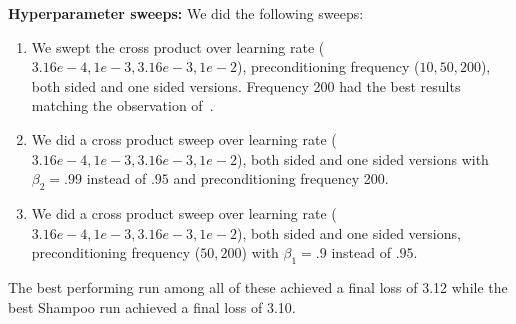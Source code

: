 \documentclass{article}
\begin{document}
\textbf{Hyperparameter sweeps:} We did the following sweeps:
\begin{enumerate}
    \item We swept the cross product over learning rate ($3.16e-4, 1e-3, 3.16e-3, 1e-2$), preconditioning frequency ($10, 50, 200$), both sided and one sided versions. Frequency 200 had the best results matching the observation of~\citet{galore}.
    \item We did a cross product sweep over learning rate ($3.16e-4, 1e-3, 3.16e-3, 1e-2$), both sided and one sided versions with $\beta_2 = .99$ instead of $.95$ and preconditioning frequency 200.
    \item We did a cross product sweep over learning rate ($3.16e-4, 1e-3, 3.16e-3, 1e-2$), both sided and one sided versions, preconditioning frequency ($50, 200$)  with $\beta_1 = .9$ instead of $.95$.
\end{enumerate}  

The best performing run among all of these achieved a final loss of 3.12 while the best Shampoo run achieved a final loss of 3.10. 
\end{document}
